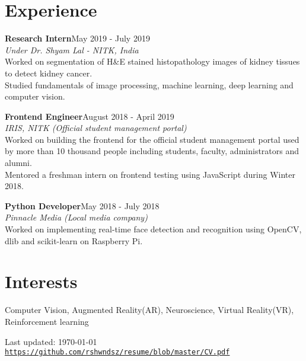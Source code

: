 \documentclass[letterpaper]{article}
\def\footerlink{https://github.com/rshwndsz/resume/blob/master/CV.pdf}
\renewenvironment{itemize}{
  \begin{list}{}{
    \setlength{\leftmargin}{1.5em}
  }
}{
  \end{list}
}
\begin{document}
\section*{Experience}
  \begin{itemize}
    \item \textbf{Research Intern}\hfill{May 2019 - July 2019}\\
    \textit{Under Dr. Shyam Lal - NITK, India}\\
    Worked on segmentation of H\&E stained histopathology images of kidney tissues to detect kidney cancer.\\
    Studied fundamentals of image processing, machine learning, deep learning and computer vision.

    \item \textbf{Frontend Engineer}\hfill{August 2018 - April 2019}\\
    \textit{IRIS, NITK (Official student management portal)}\\
    Worked on building the frontend for the official student management portal used by more than 10 thousand people including students, faculty, administrators and alumni.\\
    Mentored a freshman intern on frontend testing using JavaScript during Winter 2018.

    \item \textbf{Python Developer}\hfill{May 2018 - July 2018}\\
    \textit{Pinnacle Media (Local media company)}\\
    Worked on implementing real-time face detection and recognition using OpenCV, dlib and scikit-learn on Raspberry Pi.
  \end{itemize}

\section*{Interests}
  \begin{itemize}
    \item Computer Vision, Augmented Reality(AR), Neuroscience, Virtual Reality(VR), Reinforcement learning
  \end{itemize}

\bigskip

\begin{center}
  \begin{footnotesize}
    Last updated: \today \\
    \href{\footerlink}{\texttt{\footerlink}}
  \end{footnotesize}
\end{center}
\end{document}
